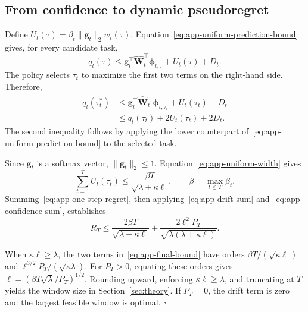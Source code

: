 \subsection{From confidence to dynamic pseudoregret}

Define \(U_t(\tau)=\beta_t\lVert\mathbf{g}_t\rVert_2w_t(\tau)\). Equation~\eqref{eq:app-uniform-prediction-bound} gives, for every candidate task,
\[
    q_t(\tau)\leq\mathbf{g}_t^{\top}\widehat{\mathbf{W}}_t^{\top}\boldsymbol{\phi}_{t,\tau}+U_t(\tau)+D_t.
\]
The policy selects \(\tau_t\) to maximize the first two terms on the right-hand side. Therefore,
\begin{align}
q_t(\tau_t^*)
&\leq\mathbf{g}_t^{\top}\widehat{\mathbf{W}}_t^{\top}\boldsymbol{\phi}_{t,\tau_t}+U_t(\tau_t)+D_t \\
&\leq q_t(\tau_t)+2U_t(\tau_t)+2D_t.
\label{eq:app-one-step-regret}
\end{align}
The second inequality follows by applying the lower counterpart of~\eqref{eq:app-uniform-prediction-bound} to the selected task.

Since \(\mathbf{g}_t\) is a softmax vector, \(\lVert\mathbf{g}_t\rVert_2\leq1\). Equation~\eqref{eq:app-uniform-width} gives
\begin{equation}
    \sum_{t=1}^{T}U_t(\tau_t)\leq\frac{\beta T}{\sqrt{\lambda+\kappa\ell}},
    \qquad \beta=\max_{t\leq T}\beta_t.
    \label{eq:app-confidence-sum}
\end{equation}
Summing~\eqref{eq:app-one-step-regret}, then applying~\eqref{eq:app-drift-sum} and~\eqref{eq:app-confidence-sum}, establishes
\begin{equation}
    R_T\leq\frac{2\beta T}{\sqrt{\lambda+\kappa\ell}}
    +\frac{2\ell^2P_T}{\sqrt{\lambda(\lambda+\kappa\ell)}}.
    \label{eq:app-final-bound}
\end{equation}

When \(\kappa\ell\geq\lambda\), the two terms in~\eqref{eq:app-final-bound} have orders \(\beta T/(\sqrt{\kappa\ell})\) and \(\ell^{3/2}P_T/(\sqrt{\kappa\lambda})\). For \(P_T>0\), equating these orders gives \(\ell=(\beta T\sqrt{\lambda}/P_T)^{1/2}\). Rounding upward, enforcing \(\kappa\ell\geq\lambda\), and truncating at \(T\) yields the window size in Section~\ref{sec:theory}. If \(P_T=0\), the drift term is zero and the largest feasible window is optimal. \hfill\(\square\)
